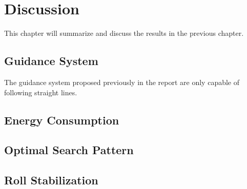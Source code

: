 \chapter{Discussion}
	This chapter will summarize and discuss the results in the previous chapter.

\section{Guidance System}
	The guidance system proposed previously in the report are only capable of following straight lines.
	

\section{Energy Consumption}


\section{Optimal Search Pattern}



\section{Roll Stabilization}



